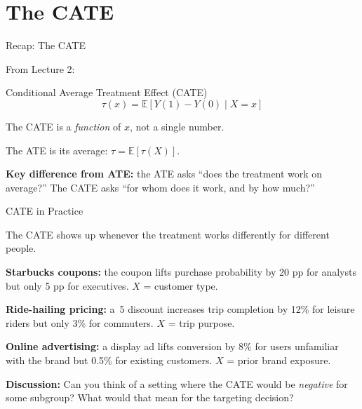 \documentclass[aspectratio=169, 11pt]{beamer}
\newcommand{\E}{\mathbb{E}}
\begin{document}
 
\section{The CATE}
 
\begin{frame}{Recap: The CATE}
 
From Lecture 2:
 
\begin{block}{Conditional Average Treatment Effect (CATE)}
\[
\tau(x) = \E[Y(1) - Y(0) \mid X = x]
\]
\end{block}
 
The CATE is a \emph{function} of $x$, not a single number.
 
\bigskip
 
The ATE is its average: $\tau = \E[\tau(X)]$.
 
\bigskip
 
\textbf{Key difference from ATE:} the ATE asks ``does the treatment work on average?'' The CATE asks ``for whom does it work, and by how much?''
\end{frame}
 
\begin{frame}{CATE in Practice}
 
The CATE shows up whenever the treatment works differently for different people.
 
\bigskip
 
\textbf{Starbucks coupons:} the coupon lifts purchase probability by 20 pp for analysts but only 5 pp for executives. $X$ = customer type.
 
\bigskip
 
\textbf{Ride-hailing pricing:} a \textyen\,5 discount increases trip completion by 12\% for leisure riders but only 3\% for commuters. $X$ = trip purpose.
 
\bigskip
 
\textbf{Online advertising:} a display ad lifts conversion by 8\% for users unfamiliar with the brand but 0.5\% for existing customers. $X$ = prior brand exposure.
 
\bigskip
\pause
 
\textbf{Discussion:} Can you think of a setting where the CATE would be \emph{negative} for some subgroup? What would that mean for the targeting decision?
\end{frame}
 
\end{document}
